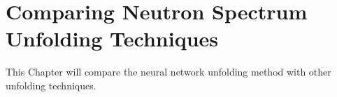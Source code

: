 \chapter{Comparing Neutron Spectrum Unfolding Techniques}\label{chap_chap6}
This Chapter will compare the neural network unfolding method with other unfolding techniques.